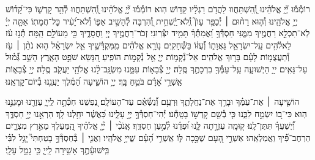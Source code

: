 \documentclass[twoside, openany, parskip=half, 11pt]{book}
\begin{document}
\newcommand{\negline}{\vspace{-\baselineskip}}

\negline

%
רוֹמְ֯מ֡וּ יְ֘יָ֤ אֱלֹהֵ֗ינוּ וְֽ֭֯הִשְׁתַּחֲווּ לַהֲדֹ֥ם רַגְלָ֗יו קָד֥וֹשׁ הֽוּא׃
רוֹמְ֯מ֡וּ יְ֘יָ֤ אֱלֹהֵ֗ינוּ וְֽ֭֯הִשְׁתַּחֲווּ לְ֯הַ֣ר קׇדְשׁ֑וֹ כִּי־קָ֝ד֗וֹשׁ יְיָ֥ אֱלֹהֵֽינוּ׃
%
וְ֯ה֤וּא רַח֨וּם ׀ יְ֯כַפֵּ֥ר עָוֺן֮ וְֽ֯לֹא־יַֽ֫שְׁחִ֥ית וְ֭֯הִרְבָּה לְ֯הָשִׁ֣יב אַפּ֑וֹ
וְ֯לֹא־יָ֝עִ֗יר כׇּל־חֲמָתֽוֹ׃
%
אַתָּ֤ה יְיָ֗ לֹֽא־תִכְלָ֣א רַחֲמֶ֣יךָ מִמֶּ֑נִּי חַסְדְּ֯ךָ֥ וַ֝אֲמִתְּ֯ךָ֗ תָּמִ֥יד יִצְּ֯רֽוּנִי׃
זְכֹר־רַחֲמֶ֣יךָ יְיָ֭ וַחֲסָדֶ֑יךָ כִּ֖י מֵעוֹלָ֣ם הֵֽמָּה׃
תְּ֯נ֥וּ עֹ֗ז לֵאלֹ֫הִ֥ים עַֽל־יִשְׂרָאֵ֥ל גַּאֲוָת֑וֹ וְ֯֝עֻזּ֗וֹ בַּשְּׁ֯חָקִֽים׃
נ֤וֹרָ֥א אֱלֹהִ֗ים מִֽמִּקְדָּ֫שֶׁ֥יךָ אֵ֤ל יִשְׂרָאֵ֗ל
ה֤וּא נֹתֵ֨ן ׀ עֹ֖ז וְ֯תַעֲצֻמ֥וֹת לָעָ֗ם בָּר֥וּךְ אֱלֹהִֽים׃
אֵל־נְ֯קָמ֥וֹת יְיָ֑ אֵ֖ל נְ֯קָמ֣וֹת הוֹפִֽיעַ׃
הִ֭נָּשֵׂא שֹׁפֵ֣ט הָאָ֑רֶץ הָשֵׁ֥ב גְּ֯֝מ֗וּל עַל־גֵּאִֽים׃
ייָ֥ הַיְשׁוּעָ֑ה עַֽל־עַמְּ֯ךָ֖ בִרְכָתֶ֣ךָ סֶּֽלָה׃
 יְיָ֣ צְ֯בָא֣וֹת עִמָּ֑נוּ מִשְׂגָּֽב־לָ֨נוּ אֱלֹהֵ֖י יַעֲקֹ֣ב סֶֽלָה׃
 יְיָ֥ צְ֯בָא֑וֹת אַֽשְׁרֵ֥י אָ֝דָ֗ם בֹּטֵ֥חַ בָּֽךְ׃
 יְיָ֥ הוֹשִׁ֑יעָה הַ֝מֶּ֗לֶךְ יַעֲנֵ֥נוּ בְ֯יוֹם־קׇרְאֵֽנוּ׃

הוֹשִׁ֤יעָה ׀ אֶת־עַמֶּ֗ךָ וּבָרֵ֥ךְ אֶת־נַחֲלָתֶ֑ךָ וּֽרְעֵ֥ם וְ֯֝נַשְּׂ֯אֵ֗ם עַד־הָעוֹלָֽם׃
נַ֭פְשֵׁנוּ חִכְּ֯תָ֣ה לַֽייָ֑ עֶזְרֵ֖נוּ וּמָגִנֵּ֣נוּ הֽוּא׃
כִּי־ב֭וֹ יִשְׂמַ֣ח לִבֵּ֑נוּ כִּ֤י בְ֯שֵׁ֖ם קׇדְשׁ֣וֹ בָטָֽחְ֯נוּ׃
יְ֯הִי־חַסְדְּ֯ךָ֣ יְיָ֣ עָלֵ֑ינוּ כַּ֝אֲשֶׁ֗ר יִחַ֥לְנוּ לָֽךְ׃
הַרְאֵ֣נוּ יְיָ֣ חַסְדֶּ֑ךָ וְ֯֝יֶשְׁעֲךָ֗ תִּתֶּן־לָֽנוּ׃
ק֭וּמָֽה עֶזְרָ֣תָה לָּ֑נוּ וּ֝פְדֵ֗נוּ לְ֯מַ֣עַן חַסְדֶּֽךָ׃
אָֽנֹכִ֨י ׀ יְ֘יָ֤ אֱלֹהֶ֗יךָ הַֽ֭מַּעַלְךָ מֵאֶ֣רֶץ מִצְרָ֑יִם הַרְחֶב־פִּ֗֝יךָ וַאֲמַלְאֵֽהוּ׃
אַשְׁרֵ֣י הָ֭עָם שֶׁכָּ֣כָה לּ֑וֹ אַֽשְׁרֵ֥י הָ֝עָ֗ם שֱׁייָ֥ אֱלֹהָֽיו׃
וַאֲנִ֤י ׀ בְּ֯חַסְדְּ֯ךָ֣ בָטַחְתִּי֮ יָ֤גֵ֥ל לִבִּ֗י בִּֽישׁוּעָ֫תֶ֥ךָ אָשִׁ֥ירָה לַֽייָ֑ כִּ֖י גָמַ֣ל עָלָֽי׃

\negline
\end{document}

